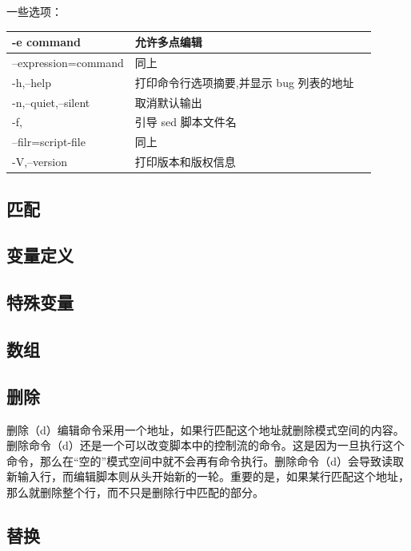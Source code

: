 一些选项：

\begin{tabular}{l|lp{20em}}
\hline
-e command             & 允许多点编辑 \\
\hline
--expression=command   & 同上 \\
\hline
-h,--help              & 打印命令行选项摘要,并显示 bug 列表的地址 \\
\hline
-n,--quiet,--silent    & 取消默认输出 \\
\hline
-f,                    & 引导 sed 脚本文件名 \\
\hline
--filr=script-file     & 同上 \\
\hline
-V,--version           & 打印版本和版权信息\\
\hline
\end{tabular}

\subsection{匹配}
\label{sec:sedPattern}

\subsection{变量定义}
\label{subsec:sedVariableDef}

\subsection{特殊变量}
\label{subsec:sedSpecialVariable}

\subsection{数组}
\label{subsec:sedArray}

\subsection{删除}
\label{subsec:sedDelete}

删除（d）编辑命令采用一个地址，如果行匹配这个地址就删除模式空间的内容。
删除命令（d）还是一个可以改变脚本中的控制流的命令。这是因为一旦执行这个
命令，那么在“空的”模式空间中就不会再有命令执行。删除命令（d）会导致读取
新输入行，而编辑脚本则从头开始新的一轮。重要的是，如果某行匹配这个地址，
那么就删除整个行，而不只是删除行中匹配的部分。

\subsection{替换}
 
